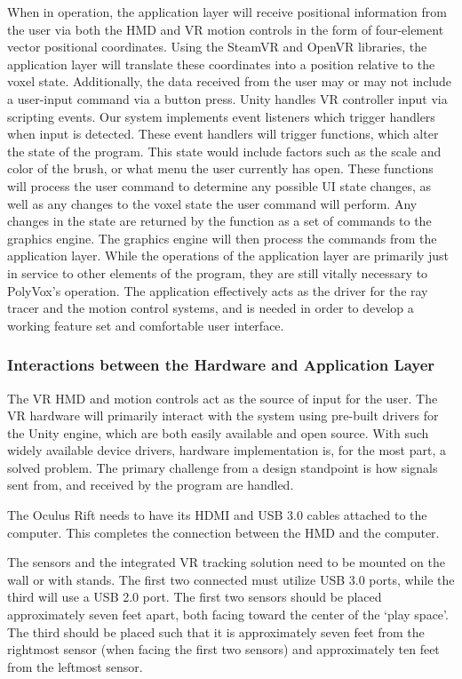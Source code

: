 \documentclass[onecolumn, draftclsnofoot,10pt, compsoc]{IEEEtran}
\newcounter{threesection}[subsubsection]
\newcounter{foursection}[threesection]
\begin{document}
When in operation, the application layer will receive positional information from the user via both the HMD and VR motion controls in the form of four-element vector positional coordinates.
Using the SteamVR and OpenVR libraries, the application layer will translate these coordinates into a position relative to the voxel state.
Additionally, the data received from the user may or may not include a user-input command via a button press. Unity handles VR controller input via scripting events.
Our system implements event listeners which trigger handlers when input is detected.
These event handlers will trigger functions, which alter the state of the program.
This state would include factors such as the scale and color of the brush, or what menu the user currently has open.
These functions will process the user command to determine any possible UI state changes, as well as any changes to the voxel state the user command will perform.
Any changes in the state are returned by the function as a set of commands to the graphics engine.
The graphics engine will then process the commands from the application layer.
While the operations of the application layer are primarily just in service to other elements of the program, they are still vitally necessary to PolyVox’s operation.
The application effectively acts as the driver for the ray tracer and the motion control systems, and is needed in order to develop a working feature set and comfortable user interface.


\subsubsection{Interactions between the Hardware and Application Layer}

The VR HMD and motion controls act as the source of input for the user.
The VR hardware will primarily interact with the system using pre-built drivers for the Unity engine, which are both easily available and open source.
With such widely available device drivers, hardware implementation is, for the most part, a solved problem.
The primary challenge from a design standpoint is how signals sent from, and received by the program are handled. 


The Oculus Rift needs to have its HDMI and USB 3.0 cables attached to the computer.
This completes the connection between the HMD and the computer. 

The sensors and the integrated VR tracking solution need to be mounted on the wall or with stands. 
The first two connected must utilize USB 3.0 ports, while the third will use a USB 2.0 port.
The first two sensors should be placed approximately seven feet apart, both facing toward the center of the ‘play space’.
The third should be placed such that it is approximately seven feet from the rightmost sensor (when facing the first two sensors) and approximately ten feet from the leftmost sensor.
\end{document}
